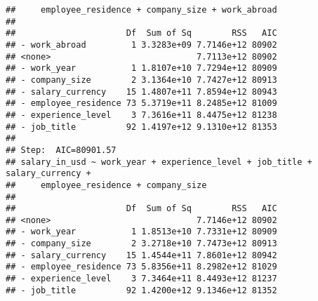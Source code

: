 \documentclass[
]{article}
\begin{document}
\begin{verbatim}
##     employee_residence + company_size + work_abroad
## 
##                      Df  Sum of Sq        RSS   AIC
## - work_abroad         1 3.3283e+09 7.7146e+12 80902
## <none>                             7.7113e+12 80902
## - work_year           1 1.8107e+10 7.7294e+12 80909
## - company_size        2 3.1364e+10 7.7427e+12 80913
## - salary_currency    15 1.4807e+11 7.8594e+12 80943
## - employee_residence 73 5.3719e+11 8.2485e+12 81009
## - experience_level    3 7.3616e+11 8.4475e+12 81238
## - job_title          92 1.4197e+12 9.1310e+12 81353
## 
## Step:  AIC=80901.57
## salary_in_usd ~ work_year + experience_level + job_title + salary_currency + 
##     employee_residence + company_size
## 
##                      Df  Sum of Sq        RSS   AIC
## <none>                             7.7146e+12 80902
## - work_year           1 1.8513e+10 7.7331e+12 80909
## - company_size        2 3.2718e+10 7.7473e+12 80913
## - salary_currency    15 1.4544e+11 7.8601e+12 80942
## - employee_residence 73 5.8356e+11 8.2982e+12 81029
## - experience_level    3 7.3464e+11 8.4493e+12 81237
## - job_title          92 1.4200e+12 9.1346e+12 81352
\end{verbatim}
\end{document}
